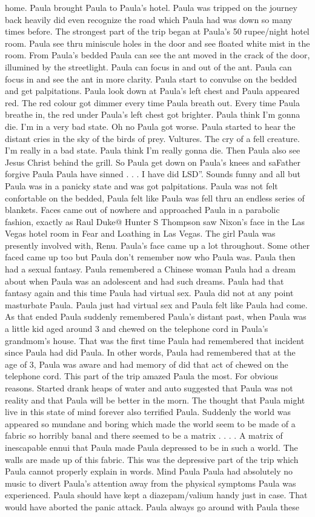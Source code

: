 \documentclass[12pt]{book}
\begin{document}
home. Paula brought Paula to Paula's hotel. Paula was tripped on the journey back heavily did even recognize the road which Paula had was down so many times before. The strongest part of the trip began at Paula's 50 rupee/night hotel room. Paula see thru miniscule holes in the door and see floated white mist in the room. From Paula's bedded Paula can see the ant moved in the crack of the door, illumined by the streetlight. Paula can focus in and out of the ant. Paula can focus in and see the ant in more clarity. Paula start to convulse on the bedded and get palpitations. Paula look down at Paula's left chest and Paula appeared red. The red colour got dimmer every time Paula breath out. Every time Paula breathe in, the red under Paula's left chest got brighter. Paula think I'm gonna die. I'm in a very bad state. Oh no Paula got worse. Paula started to hear the distant cries in the sky of the birds of prey. Vultures. The cry of a fell creature. I'm really in a bad state. Paula think I'm really gonna die. Then Paula also see Jesus Christ behind the grill. So Paula get down on Paula's knees and saFather forgive Paula Paula have sinned . . . I have did LSD''. Sounds funny and all but Paula was in a panicky state and was got palpitations. Paula was not felt confortable on the bedded, Paula felt like Paula was fell thru an endless series of blankets. Faces came out of nowhere and approached Paula in a parabolic fashion, exactly as Raul Duke@ Hunter S Thompson saw Nixon's face in the Las Vegas hotel room in Fear and Loathing in Las Vegas. The girl Paula was presently involved with, Renu. Paula's face came up a lot throughout. Some other faced came up too but Paula don't remember now who Paula was. Paula then had a sexual fantasy. Paula remembered a Chinese woman Paula had a dream about when Paula was an adolescent and had such dreams. Paula had that fantasy again and this time Paula had virtual sex. Paula did not at any point masturbate Paula. Paula just had virtual sex and Paula felt like Paula had come. As that ended Paula suddenly remembered Paula's distant past, when Paula was a little kid aged around 3 and chewed on the telephone cord in Paula's grandmom's house. That was the first time Paula had remembered that incident since Paula had did Paula. In other words, Paula had remembered that at the age of 3, Paula was aware and had memory of did that act of chewed on the telephone cord. This part of the trip amazed Paula the most. For obvious reasons. Started drank heaps of water and auto suggested that Paula was not reality and that Paula will be better in the morn. The thought that Paula might live in this state of mind forever also terrified Paula. Suddenly the world was appeared so mundane and boring which made the world seem to be made of a fabric so horribly banal and there seemed to be a matrix . . . . A matrix of inescapable ennui that Paula made Paula depressed to be in such a world. The walls are made up of this fabric. This was the depressive part of the trip which Paula cannot properly explain in words. Mind Paula Paula had absolutely no music to divert Paula's attention away from the physical symptoms Paula was experienced. Paula should have kept a diazepam/valium handy just in case. That would have aborted the panic attack. Paula always go around with Paula these 
\end{document}
